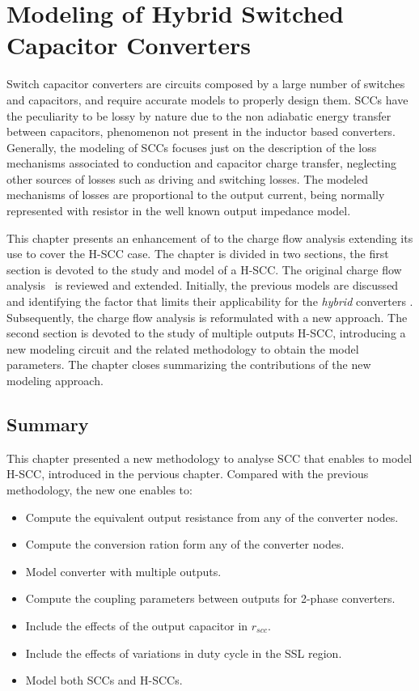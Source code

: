 \chapter[Modeling of H-SCC]{Modeling of Hybrid Switched Capacitor Converters}

Switch capacitor converters are circuits composed by a large number of switches and capacitors, and require accurate models to properly design them. SCCs have the peculiarity to be lossy by nature due to the non adiabatic energy transfer between capacitors, phenomenon not present in the inductor based converters. Generally, the modeling of SCCs focuses just on the description of the loss mechanisms associated to conduction and capacitor charge transfer, neglecting other sources of losses such as driving and switching losses. The modeled mechanisms of losses are proportional to the output current, being  normally represented with resistor in the well known output impedance model.

This chapter presents an enhancement of  to the charge flow analysis extending its use to cover the H-SCC case.   The chapter is divided in two sections, the first section is devoted to the study and model of a H-SCC. The original charge flow analysis~\cite{95Makowski,Seeman:EECS-2009-78} is reviewed and extended. Initially, the previous models are discussed and identifying the factor that limits their applicability for the \emph{hybrid} converters . Subsequently, the charge flow analysis is reformulated with a new approach. The second section is devoted to the study of multiple outputs H-SCC, introducing a new modeling circuit and the related methodology to obtain the model parameters. The chapter closes summarizing the contributions of the new modeling approach.




\section{Summary}
This chapter presented a new methodology to analyse SCC that enables to model H-SCC, introduced in the pervious chapter. Compared with the previous methodology, the new one enables to:
\begin{itemize}
  \item Compute the equivalent output resistance from any of the converter nodes.
  \item Compute the conversion ration form any of the converter nodes.
  \item Model converter with multiple outputs.
  \item Compute the coupling parameters between outputs for 2-phase converters.
  \item Include the effects of the output capacitor in $r_{scc}$.
  \item Include the effects of variations in duty cycle in the SSL region.
  \item Model both SCCs and H-SCCs.
\end{itemize}


\clearpage

 